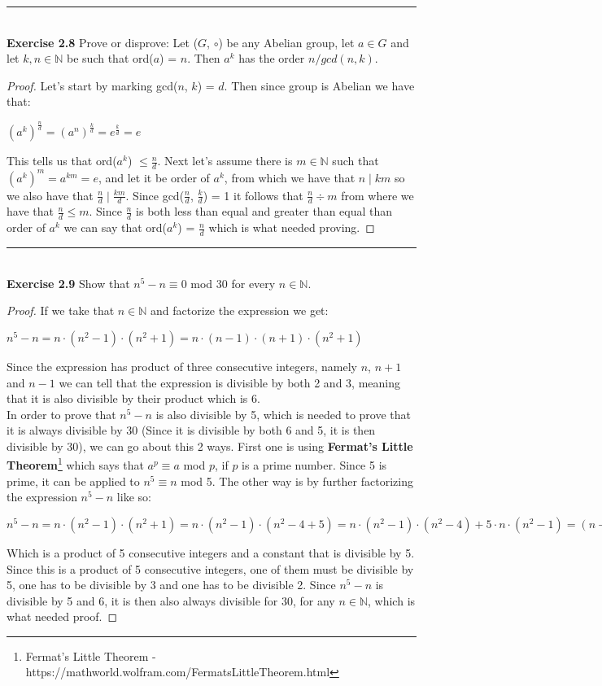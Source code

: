 \documentclass[a4paper]{article}
\begin{document}
\noindent\rule{12cm}{0.4pt}\\
\noindent \textbf{Exercise 2.8} Prove or disprove: Let ($G$, $\circ$) be any Abelian group, let $a \in G$ and let $k, n \in \mathbb{N}$ be such that ord($a$) = $n$. Then $a^{k}$ has the order $n/gcd(n,k)$.
\begin{proof}
Let's start by marking gcd($n$, $k$) = $d$. Then since group is Abelian we have that:
\begin{center}
$(a^k)^{\frac{n}{d}} = (a^n)^{\frac{k}{d}}= e^{\frac{k}{d}} = e$
\end{center}
This tells us that ord($a^k$) $\leq \frac{n}{d}$. Next let's assume there is $m \in \mathbb{N}$ such that $(a^k)^m=a^{km}=e$, and let it be order of $a^k$, from which we have that $n \mid km$ so we also have that $\frac{n}{d} \mid \frac{km}{d}$. Since gcd($\frac{n}{d}$, $\frac{k}{d}$) = 1 it follows that $\frac{n}{d} \div m$ from where we have that $\frac{n}{d} \leq m$. Since $\frac{n}{d}$ is both less than equal and greater than equal than order of $a^k$ we can say that ord($a^k$) = $\frac{n}{d}$ which is what needed proving.
\end{proof}



\noindent\rule{12cm}{0.4pt}\\
\noindent \textbf{Exercise 2.9} Show that $n^5 - n \equiv 0$ mod 30 for every $n \in \mathbb{N}$.
\begin{proof}
If we take that $n \in \mathbb{N}$ and factorize the expression we get:
\begin{center}
$n^5 - n = n \cdot (n^2 - 1) \cdot (n^2 + 1) = n \cdot (n - 1) \cdot (n + 1) \cdot (n^2 + 1)$	
\end{center}
Since the expression has product of three consecutive integers, namely $n$, $n+1$ and $n-1$ we can tell that the expression is divisible by both 2 and 3, meaning that it is also divisible by their product which is 6.\\
In order to prove that $n^5 - n$ is also divisible by 5, which is needed to prove that it is always divisible by 30 (Since it is divisible by both 6 and 5, it is then divisible by 30), we can go about this 2 ways. First one is using \textbf{Fermat's Little Theorem}\footnote{Fermat's Little Theorem - https://mathworld.wolfram.com/FermatsLittleTheorem.html} which says that $a^p \equiv a$ mod $p$, if $p$ is a prime number. Since 5 is prime, it can be applied to $n^5 \equiv n$ mod 5. The other way is by further factorizing the expression $n^5 - n$ like so:
\begin{center}
$n^5 - n = n \cdot (n^2 - 1) \cdot (n^2 + 1) = n \cdot (n^2 - 1) \cdot (n^2 - 4 + 5) = n \cdot (n^2 - 1) \cdot (n^2 - 4) + 5 \cdot n \cdot (n^2 - 1) = (n - 2) \cdot (n -1) \cdot n \cdot (n + 1) \cdot (n + 2) + 5$
\end{center}
Which is a product of 5 consecutive integers and a constant that is divisible by 5. Since this is a product of 5 consecutive integers, one of them must be divisible by 5, one has to be divisible by 3 and one has to be divisible 2. Since $n^5 - n$ is divisible by 5 and 6, it is then also always divisible for 30, for any $n \in \mathbb{N}$, which is what needed proof.

\end{proof}
\end{document}
